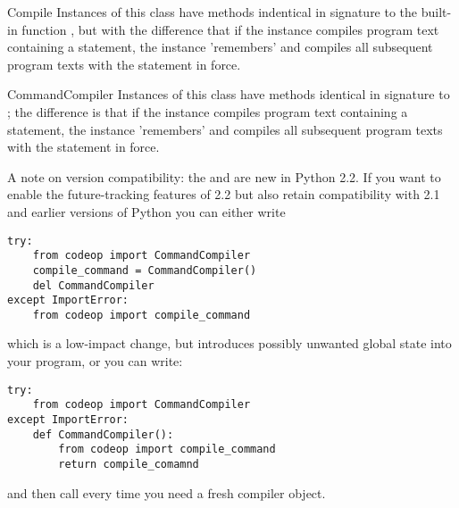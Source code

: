 \begin{classdesc}{Compile}{}
Instances of this class have  methods indentical in
signature to the built-in function , but with the
difference that if the instance compiles program text containing a
 statement, the instance 'remembers' and compiles
all subsequent program texts with the statement in force.
\end{classdesc}

\begin{classdesc}{CommandCompiler}{}
Instances of this class have  methods identical in
signature to ; the difference is that if the
instance compiles program text containing a 
statement, the instance 'remembers' and compiles all subsequent
program texts with the statement in force.
\end{classdesc}

A note on version compatibility: the  and
 are new in Python 2.2.  If you want to enable
the future-tracking features of 2.2 but also retain compatibility with
2.1 and earlier versions of Python you can either write

\begin{verbatim}
try:
    from codeop import CommandCompiler
    compile_command = CommandCompiler()
    del CommandCompiler
except ImportError:
    from codeop import compile_command
\end{verbatim}

which is a low-impact change, but introduces possibly unwanted global
state into your program, or you can write:

\begin{verbatim}
try:
    from codeop import CommandCompiler
except ImportError:
    def CommandCompiler():
        from codeop import compile_command
        return compile_comamnd
\end{verbatim}

and then call  every time you need a fresh
compiler object.
